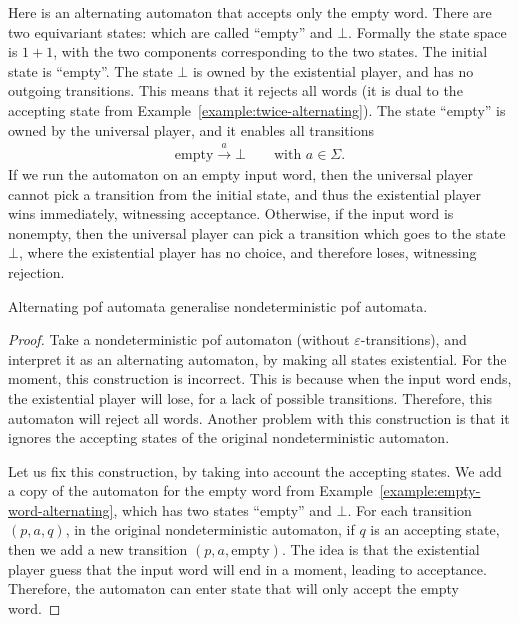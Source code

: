 \begin{myexample} \label{example:empty-word-alternating} 
	Here is an alternating automaton that accepts only the empty word. There are two equivariant states: which are called  ``empty'' and $\bot$. Formally  the state space is $1+1$, with the two components corresponding to the two states. The initial state is ``empty''. The state $\bot$ is owned by the existential player, and  has no outgoing transitions. This means that it rejects all words (it is dual to the accepting state from Example~\ref{example:twice-alternating}). The state ``empty'' is owned by the universal player, and it enables all transitions 
	\begin{align*}
	\text{empty} \stackrel a \to \bot \qquad \text{with $a \in \Sigma$}.
	\end{align*}
	If we run the automaton on an empty input word, then the universal player cannot pick a transition from the initial state, and thus  the existential player wins immediately,  witnessing acceptance. Otherwise, if the input word is nonempty, then the universal player can pick a transition which goes to the state $\bot$, where the existential player has no choice, and therefore loses, witnessing rejection. 
\end{myexample}

\begin{theorem}
	Alternating pof automata generalise nondeterministic pof automata.
\end{theorem}
\begin{proof}
	Take a nondeterministic pof automaton (without $\varepsilon$-transitions), and interpret it as an alternating automaton, by making all states existential. For the moment, this construction is incorrect. This is because when the input word ends, the existential player will lose, for a lack of possible transitions. Therefore, this automaton will reject all words. Another problem with this construction is that it ignores the accepting states of the original nondeterministic automaton.

	Let us fix this construction, by taking into account the accepting states. We add a copy of the automaton for the empty word from Example~\ref{example:empty-word-alternating}, which has two states ``empty'' and $\bot$. For each transition $(p,a,q)$, in the original nondeterministic automaton, if $q$ is an accepting state, then we add a new transition $(p,a,\text{empty})$. The idea is that the existential player guess that the input word will end in a moment,  leading to acceptance. Therefore, the automaton can enter state that will only accept the empty word.  
\end{proof}

